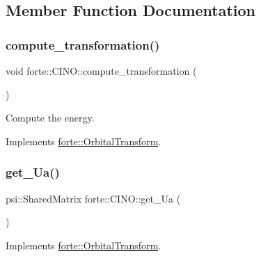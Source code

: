 \subsection{Member Function Documentation}
\mbox{\label{classforte_1_1_c_i_n_o_a8ac65e808e51c30f613cea8fcdbec851}} 
\subsubsection{\texorpdfstring{compute\+\_\+transformation()}{compute\_transformation()}}
{\footnotesize\ttfamily void forte\+::\+C\+I\+N\+O\+::compute\+\_\+transformation (\begin{DoxyParamCaption}{ }\end{DoxyParamCaption})\hspace{0.3cm}{\ttfamily [virtual]}}



Compute the energy. 



Implements \mbox{\hyperlink{classforte_1_1_orbital_transform_a48704cbce9fd066ef7e58270bb413c25}{forte\+::\+Orbital\+Transform}}.

\mbox{\label{classforte_1_1_c_i_n_o_a382fe0963a51a908790fda6a7aab0e7c}} 
\subsubsection{\texorpdfstring{get\+\_\+\+Ua()}{get\_Ua()}}
{\footnotesize\ttfamily psi\+::\+Shared\+Matrix forte\+::\+C\+I\+N\+O\+::get\+\_\+\+Ua (\begin{DoxyParamCaption}{ }\end{DoxyParamCaption})\hspace{0.3cm}{\ttfamily [virtual]}}



Implements \mbox{\hyperlink{classforte_1_1_orbital_transform_aedd124480b35eba56653109578c05ec9}{forte\+::\+Orbital\+Transform}}.

\mbox{\label{classforte_1_1_c_i_n_o_a24b4455c4b640b7bc01b0f12b0ecb655}} 
